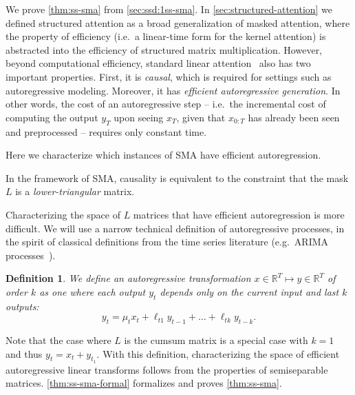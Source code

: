 \documentclass{article}
\newcommand{\citep}{\parencite}
\newtheorem{definition}[theorem]{Definition}
\newcommand{\R}{\mathbb{R}}
\begin{document}
We prove \cref{thm:ss-sma} from \cref{sec:ssd:1ss-sma}.
In \cref{sec:structured-attention} we defined structured attention as a broad generalization of masked attention,
where the property of efficiency (i.e.\ a linear-time form for the kernel attention) is abstracted into the efficiency of structured matrix multiplication.
However, beyond computational efficiency, standard linear attention~\citep{katharopoulos2020transformers} also has two important properties.
First, it is \emph{causal}, which is required for settings such as autoregressive modeling.
Moreover, it has \emph{efficient autoregressive generation}.
In other words, the cost of an autoregressive step -- i.e.\ the incremental cost of computing the output $y_T$ upon seeing $x_T$, given that $x_{0:T}$ has already been seen and preprocessed --
requires only constant time.

Here we characterize which instances of SMA have efficient autoregression.

In the framework of SMA,
causality is equivalent to the constraint that the mask $L$ is a \emph{lower-triangular} matrix.

Characterizing the space of $L$ matrices that have efficient autoregression is more difficult.
We will use a narrow technical definition of autoregressive processes, in the spirit of classical definitions from the time series literature (e.g.\ ARIMA processes~\citep{box2015time}).
\begin{definition}
We define an autoregressive transformation $x \in \R^T \mapsto y \in \R^T$ of order $k$ as one where each output $y_t$ depends only on the current input and last $k$ outputs:
\begin{equation}
  \label{eq:efficient-ar}
  y_t = \mu_t x_t + \ell_{t1} y_{t-1} + \dots + \ell_{tk} y_{t-k}.
\end{equation}
\end{definition}
Note that the case where $L$ is the cumsum matrix is a special case with $k=1$ and thus $y_t = x_t + y_{t_1}$.
With this definition, characterizing the space of efficient autoregressive linear transforms follows from the properties of semiseparable matrices.
\cref{thm:ss-sma-formal} formalizes and proves \cref{thm:ss-sma}.
\end{document}
